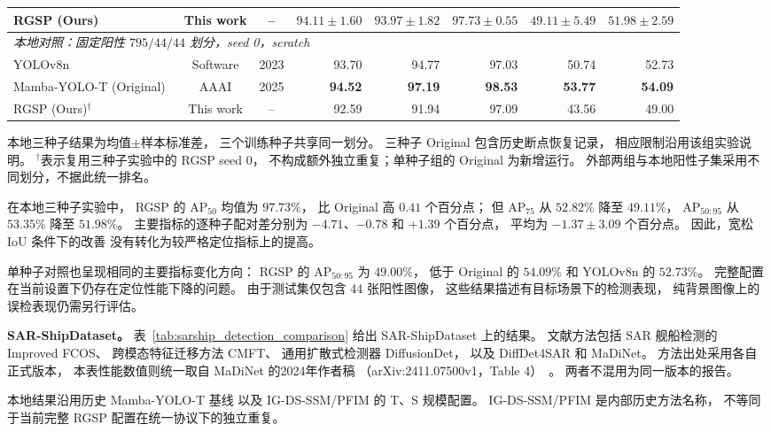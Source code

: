 \begin{table}[!t]
\begin{tabular*}{\textwidth}{@{\extracolsep{\fill}}lccrrrrr}
RGSP (Ours)
& This work & --
& $\mathbf{94.11\pm1.60}$ & $93.97\pm1.82$ & $\mathbf{97.73\pm0.55}$ & $49.11\pm5.49$ & $51.98\pm2.59$ \\
\midrule
\multicolumn{8}{l}{\textit{本地对照：固定阳性 $795/44/44$ 划分，seed 0，scratch}} \\
YOLOv8n~\cite{yolov82023}
& Software & 2023
& 93.70 & 94.77 & 97.03 & 50.74 & 52.73 \\
Mamba-YOLO-T (Original)~\cite{mambayolo2024}
& AAAI & 2025
& \textbf{94.52} & \textbf{97.19} & \textbf{98.53} & \textbf{53.77} & \textbf{54.09} \\
RGSP (Ours)$^{\dagger}$
& This work & --
& 92.59 & 91.94 & 97.09 & 43.56 & 49.00 \\
\bottomrule
\end{tabular*}
\smallskip
\begin{minipage}{\linewidth}
\footnotesize
本地三种子结果为均值$\pm$样本标准差，
三个训练种子共享同一划分。
三种子 Original 包含历史断点恢复记录，
相应限制沿用该组实验说明。
$^{\dagger}$表示复用三种子实验中的 RGSP seed 0，
不构成额外独立重复；单种子组的 Original 为新增运行。
外部两组与本地阳性子集采用不同划分，不据此统一排名。
\end{minipage}
\end{table}

在本地三种子实验中，
RGSP 的 AP$_{50}$ 均值为 $97.73\%$，
比 Original 高 $0.41$ 个百分点；
但 AP$_{75}$ 从 $52.82\%$ 降至 $49.11\%$，
AP$_{50:95}$ 从 $53.35\%$ 降至 $51.98\%$。
主要指标的逐种子配对差分别为
$-4.71$、$-0.78$ 和 $+1.39$ 个百分点，
平均为 $-1.37\pm3.09$ 个百分点。
因此，宽松 IoU 条件下的改善
没有转化为较严格定位指标上的提高。

单种子对照也呈现相同的主要指标变化方向：
RGSP 的 AP$_{50:95}$ 为 $49.00\%$，
低于 Original 的 $54.09\%$
和 YOLOv8n 的 $52.73\%$。
完整配置在当前设置下仍存在定位性能下降的问题。
由于测试集仅包含 44 张阳性图像，
这些结果描述有目标场景下的检测表现，
纯背景图像上的误检表现仍需另行评估。

\textbf{SAR-ShipDataset。}
表~\ref{tab:sarship_detection_comparison}
给出 SAR-ShipDataset 上的结果。
文献方法包括 SAR 舰船检测的 Improved FCOS、
跨模态特征迁移方法 CMFT、
通用扩散式检测器 DiffusionDet，
以及 DiffDet4SAR 和 MaDiNet。
方法出处采用各自正式版本，
本表性能数值则统一取自 MaDiNet 的2024年作者稿
（arXiv:2411.07500v1，Table 4）~\cite{madinet_preprint}。
两者不混用为同一版本的报告。

本地结果沿用历史 Mamba-YOLO-T 基线
以及 IG-DS-SSM/PFIM 的 T、S 规模配置。
IG-DS-SSM/PFIM 是内部历史方法名称，
不等同于当前完整 RGSP 配置在统一协议下的独立重复。

